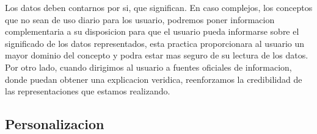 Los datos deben contarnos por si, que significan.
En caso complejos, los conceptos que no sean de uso diario para los usuario, podremos poner informacion
complementaria a su disposicion para que el usuario pueda informarse sobre el significado de los datos 
representados, esta practica proporcionara al usuario un mayor dominio del concepto y podra estar mas
seguro de su lectura de los datos.
Por otro lado, cuando dirigimos al usuario a fuentes oficiales de informacion, donde puedan obtener una explicacion veridica,
reenforzamos la credibilidad de las representaciones que estamos realizando.

\subsection{Personalizacion}
\begin{comment}
--relevante de manera general vs relevante personal
--casos personales
--aplicabilidad
--solventar problema en particular

    

\begin{itemize}

      \item Herramientas necesarias para que el usuario entienda la informacion y de porque
 \item conocimientos multidisciplinares
    \item fuentes fiables, actualizacion periodica
\end{itemize}
\end{comment}